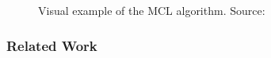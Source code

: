 \begin{figure}[width=0.9\textwidth, height=0.4\textheight]
\caption{Visual example of the \acs{MCL} algorithm. Source:~\citep{thrun:prob_robo}}
\label{fig:mcl}
\end{figure}


\subsubsection*{Related Work}

